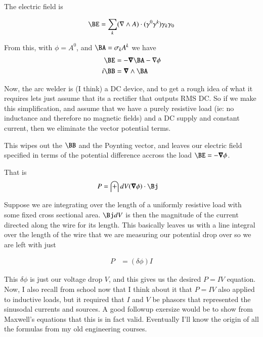 \documentclass{article}
\begin{document}
The electric field is

\begin{align*}
\BE &= \sum_k (\grad \wedge A) \cdot (\gamma^0 \gamma^k) \gamma_k \gamma_0 \\
\end{align*}

From this, with $\phi = A^0$, and $\BA = \sigma_k A^k$ we have
\begin{align*}
\BE &= -\spacegrad \BA - \grad \phi \\
i\BB &= \spacegrad \wedge \BA
\end{align*}

Now, the arc welder is (I think) a DC device, and to 
get a rough idea of what it requires lets just assume that its a rectifier that outputs RMS DC.
So if we make this simplification, and assume that we have a 
purely resistive load (ie: no inductance and therefore no magnetic fields) and a DC supply and constant current, then
we eliminate the vector potential terms.

This wipes out the $\BB$ and the Poynting vector, and leaves our electric field specified in terms
of the potential difference accross the load $\BE = -\spacegrad \phi$.

That is
\begin{align*}
P &= \int dV (\spacegrad \phi) \cdot \Bj
\end{align*}

Suppose we are integrating over the length of a uniformly resistive load with some fixed cross sectional area.  $\Bj dV$ is then the magnitude of the current directed along the wire for its length.  This basically leaves us with a line integral over the length of the wire that we are measuring our potential drop over so we are left with just

\begin{align*}
P &= (\delta \phi) I
\end{align*}

This $\delta \phi$ is just our voltage drop $V$, and this gives us the desired $P = I V$ equation.
Now, I also recall from school
now that I think about it that $P = I V$ also applied to inductive loads, but it required that $I$ and $V$ be phasors that
represented the sinusodal currents and sources.  A good followup exersize would be to show from Maxwell's equations
that this is in fact valid.  Eventually I'll know the origin of all the formulas from my old engineering courses.

%
%
\end{document}

